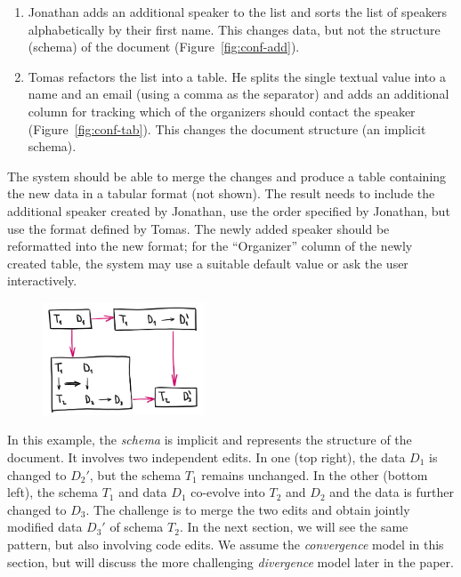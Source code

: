 \documentclass[english,submission]{programming}
\DeclareRobustCommand{\frameworkbox}[1]{\leftbar#1\endleftbar}
\newcommand{\frameworkboxtitle}[1]{\noindent{\firamedium #1.}\quad}
\begin{document}
\begin{enumerate}
\item Jonathan adds an additional speaker to the list and sorts the list of speakers
  alphabetically by their first name. This changes data, but not the structure (schema) of
  the document (Figure~\ref{fig:conf-add}).
\item Tomas refactors the list into a table. He splits the single textual value
  into a name and an email (using a comma as the separator) and adds an additional column for
  tracking which of the organizers should contact the speaker (Figure~\ref{fig:conf-tab}).
  This changes the document structure (an implicit schema).
\end{enumerate}

\noindent
The system should be able to merge the changes and produce a table containing the new data
in a tabular format (not shown). The result needs to include the additional speaker
created by Jonathan, use the order specified by Jonathan, but use the format defined by
Tomas. The newly added speaker should be reformatted into the new format; for the
``Organizer'' column of the newly created table, the system may use a suitable default value
or ask the user interactively.

\frameworkbox{
\begin{figure}
\vspace{-0.5em}
\includegraphics[width=13em]{figures/arr-datafork.png}
\vspace{-1em}
\end{figure}
\frameworkboxtitle{Merging Data and Code Edits}
In this example, the \emph{schema} is implicit and represents the structure of the document.
It involves two independent edits. In one (top right), the data $D_1$ is
changed to $D_2'$, but the schema $T_1$ remains unchanged. In the other (bottom left), the
schema $T_1$ and data $D_1$ co-evolve into $T_2$ and $D_2$ and the data is further changed
to $D_3$. The challenge is to merge the two edits and obtain jointly modified data $D_3'$
of schema $T_2$. In the next section, we will see the same pattern, but also involving
code edits. We assume the \emph{convergence} model in this section, but will discuss
the more challenging \emph{divergence} model later in the paper.}
\end{document}
